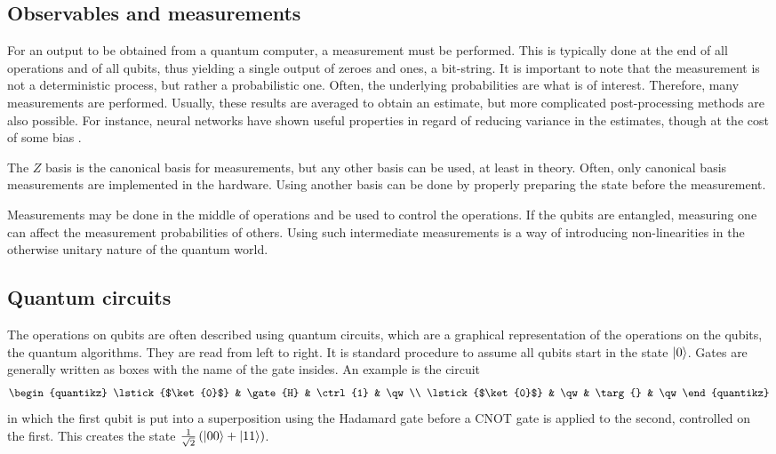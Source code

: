 \subsection{Observables and measurements}
For an output to be obtained from a quantum computer, a measurement must be performed.
This is typically done at the end of all operations and of all qubits, thus yielding a single output of zeroes and ones, a bit-string.
It is important to note that the measurement is not a deterministic process, but rather a probabilistic one.
Often, the underlying probabilities are what is of interest.
Therefore, many measurements are performed.
Usually, these results are averaged to obtain an estimate, but more complicated post-processing methods are also possible.
For instance, neural networks have shown useful properties in regard of reducing variance in the estimates, though at the cost of some bias \cite{torlai2020}.

The $Z$ basis is the canonical basis for measurements, but any other basis can be used, at least in theory.
Often, only canonical basis measurements are implemented in the hardware.
Using another basis can be done by properly preparing the state before the measurement.

Measurements may be done in the middle of operations and be used to control the operations.
If the qubits are entangled, measuring one can affect the measurement probabilities of others.
Using such intermediate measurements is a way of introducing non-linearities in the otherwise unitary nature of the quantum world.


\subsection{Quantum circuits}
The operations on qubits are often described using quantum circuits, which are a graphical representation of the operations on the qubits, the quantum algorithms.
They are read from left to right.
It is standard procedure to assume all qubits start in the state $\ket{0}$.
Gates are generally written as boxes with the name of the gate insides.
An example is the circuit
\begin{equation}
    \begin{quantikz}
        \lstick{$\ket{0}$} & \gate{H} & \ctrl{1} & \qw \\
        \lstick{$\ket{0}$} & \qw & \targ{} & \qw
    \end{quantikz}
\end{equation}
in which the first qubit is put into a superposition using the Hadamard gate before a CNOT gate is applied to the second, controlled on the first.
This creates the state $\frac{1}{\sqrt{2}}\left(\ket{00} + \ket{11}\right)$.